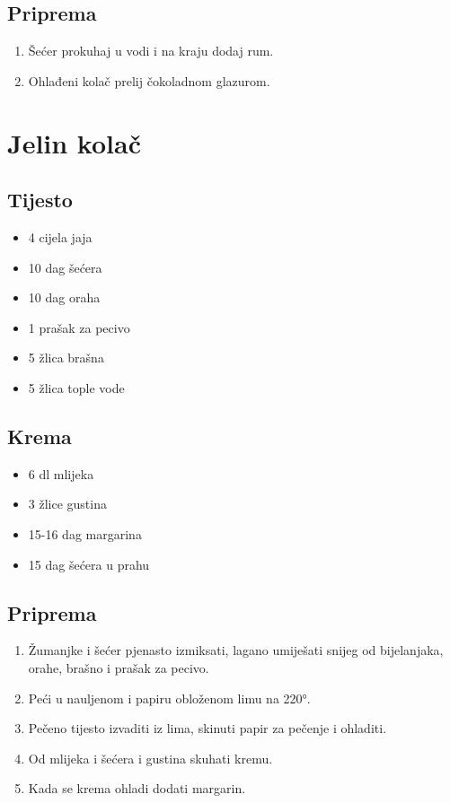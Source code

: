 \documentclass{article}
\begin{document}
\subsection{Priprema}
\begin{enumerate}
  \item Šećer prokuhaj u vodi i na kraju dodaj rum.
  \item Ohlađeni kolač prelij čokoladnom glazurom.
\end{enumerate}

\section{Jelin kolač}
\subsection{Tijesto}
\begin{itemize}
  \item 4 cijela jaja
  \item 10 dag šećera
  \item 10 dag oraha
  \item 1 prašak za pecivo
  \item 5 žlica brašna
  \item 5 žlica tople vode
\end{itemize}

\subsection{Krema}
\begin{itemize}
    \item 6 dl mlijeka
    \item 3 žlice gustina 
    \item 15-16 dag margarina 
    \item 15 dag šećera u prahu
\end{itemize}

\subsection{Priprema}
\begin{enumerate}
  \item Žumanjke i šećer pjenasto izmiksati, lagano umiješati snijeg od bijelanjaka, orahe, brašno i prašak za pecivo.
  \item Peći u nauljenom i papiru obloženom limu na 220°.
  \item Pečeno tijesto izvaditi iz lima, skinuti papir za pečenje i ohladiti.
  \item Od mlijeka i šećera i gustina skuhati kremu.
  \item Kada se krema ohladi dodati margarin.
\end{enumerate}
\end{document}
